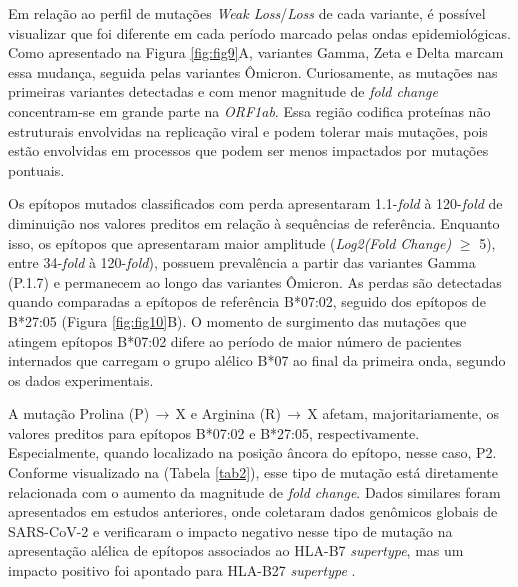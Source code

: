 \begin{justifying}
\begin{figure}
\end{figure}

\vspace{10mm}

Em relação ao perfil de mutações  \textit{Weak Loss}/\textit{Loss} de cada variante, é possível visualizar que foi diferente em cada período marcado pelas ondas epidemiológicas. Como apresentado na Figura \ref{fig:fig9}A, variantes Gamma, Zeta e Delta marcam essa mudança, seguida pelas variantes Ômicron. Curiosamente, as mutações nas primeiras variantes detectadas e com menor magnitude de \textit{fold change} concentram-se em grande parte na \textit{ORF1ab}. Essa região codifica proteínas não estruturais envolvidas na replicação viral e podem tolerar mais mutações, pois estão envolvidas em processos que podem ser menos impactados por mutações pontuais.

Os epítopos mutados classificados com perda apresentaram  1.1-\textit{fold} à 120-\textit{fold} de diminuição nos valores preditos em relação à sequências de referência.  Enquanto isso, os epítopos que apresentaram maior amplitude (\textit{Log2(Fold Change)} $\geq$ 5), entre 34-\textit{fold} à 120-\textit{fold}), possuem prevalência a partir das variantes Gamma (P.1.7) e permanecem ao longo das variantes Ômicron.  As perdas são detectadas quando comparadas a epítopos de referência B*07:02, seguido dos epítopos de B*27:05 (Figura \ref{fig:fig10}B). O momento de surgimento das mutações que atingem epítopos B*07:02 difere ao período de maior número de pacientes internados que carregam o grupo alélico B*07 ao final da primeira onda, segundo os dados experimentais.

A mutação Prolina (P)$\,\to\,$X e Arginina (R)$\,\to\,$X afetam, majoritariamente, os valores preditos para  epítopos B*07:02 e B*27:05, respectivamente. Especialmente, quando localizado na posição âncora do epítopo, nesse caso, P2.  Conforme visualizado na (Tabela \ref{tab2}),   esse tipo de mutação está diretamente relacionada com o aumento da magnitude de \textit{fold change}. Dados similares foram apresentados em estudos anteriores, onde coletaram dados genômicos globais de SARS-CoV-2 e verificaram o impacto negativo nesse tipo de mutação na apresentação alélica de epítopos associados ao HLA-B7 \textit{supertype}, mas um impacto positivo foi apontado para HLA-B27 \textit{supertype}  \cite{Hamelin:2022}. 


\end{justifying}
